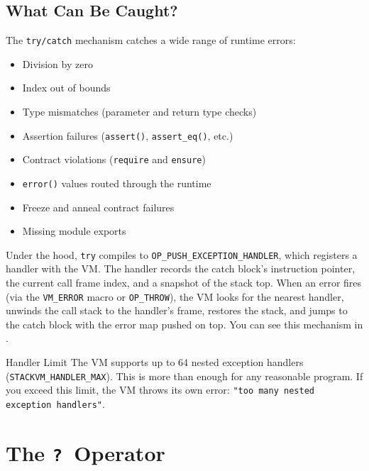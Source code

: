 \subsection{What Can Be Caught?}\label{sec:catchable-errors}

The \lstinline|try/catch| mechanism catches a wide range of runtime errors:

\begin{itemize}
  \item Division by zero
  \item Index out of bounds
  \item Type mismatches (parameter and return type checks)
  \item Assertion failures (\lstinline|assert()|, \lstinline|assert_eq()|, etc.)
  \item Contract violations (\lstinline|require| and \lstinline|ensure|)
  \item \lstinline|error()| values routed through the runtime
  \item Freeze and anneal contract failures
  \item Missing module exports
\end{itemize}

Under the hood, \lstinline|try| compiles to \lstinline|OP_PUSH_EXCEPTION_HANDLER|, which registers a handler with the VM. The handler records the catch block's instruction pointer, the current call frame index, and a snapshot of the stack top. When an error fires (via the \lstinline|VM_ERROR| macro or \lstinline|OP_THROW|), the VM looks for the nearest handler, unwinds the call stack to the handler's frame, restores the stack, and jumps to the catch block with the error map pushed on top. You can see this mechanism in .

\begin{notebox}{Handler Limit}
The VM supports up to 64 nested exception handlers (\lstinline|STACKVM_HANDLER_MAX|). This is more than enough for any reasonable program. If you exceed this limit, the VM throws its own error: \lstinline|"too many nested exception handlers"|.
\end{notebox}

\section{The \texttt{?}\ Operator}\label{sec:question-operator}

